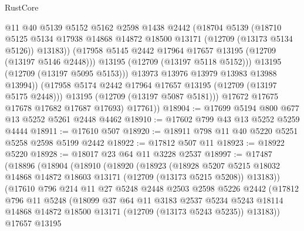 \begin{lexlean}{RustCore}
\begin{coremodule}
                    @11
                    @40
                    @5139
                    @5152
                    @5162
                    @2598
                    @1438
                    @2442
                    (@18704
                      @5139
                      (@18710
                        @5125
                        @5134
                        @17938
                        @14868
                        @14872
                        @18500
                        @13171
                        (@12709 (@13173 @5134 @5126))
                        @13183))
                    (@17958 @5145 @2442 @17964 @17657 @13195 (@12709 (@13197 @5146 @2448)))
                    @13195
                    (@12709 (@13197 @5118 @5152)))
                  @13195
                  (@12709 (@13197 @5095 @5153)))
                @13973
                @13976
                @13979
                @13983
                @13988
                @13994))
            (@17958 @5174 @2442 @17964 @17657 @13195 (@12709 (@13197 @5175 @2448)))
            @13195
            (@12709 (@13197 @5087 @5181)))
          @17672
          @17675
          @17678
          @17682
          @17687
          @17693)
        @17761))
@18904 := @17699 @5194 @800 @677 @13 @5252 @5261 @2448 @4462
@18910 := @17602 @799 @43 @13 @5252 @5259 @4444
@18911 := @17610 @507
@18920 := @18911 @798 @11 @40 @5220 @5251 @5258 @2598 @5199 @2442
@18922 := @17812 @507 @11
@18923 := @18922 @5220
@18928 := @18017 @23 @64 @11 @3228 @2537
@18997 := @17487
    (@18896
      (@18904
        (@18910
          (@18920
            (@18923
              (@18928
                @5207
                @5215
                @18032
                @14868
                @14872
                @18603
                @13171
                (@12709 (@13173 @5215 @5208))
                @13183))
            (@17610
              @796
              @214
              @11
              @27
              @5248
              @2448
              @2503
              @2598
              @5226
              @2442
              (@17812
                @796
                @11
                @5248
                (@18099
                  @37
                  @64
                  @11
                  @3183
                  @2537
                  @5234
                  @5243
                  @18114
                  @14868
                  @14872
                  @18500
                  @13171
                  (@12709 (@13173 @5243 @5235))
                  @13183))
              @17657
              @13195

\end{coremodule}
\end{lexlean}
